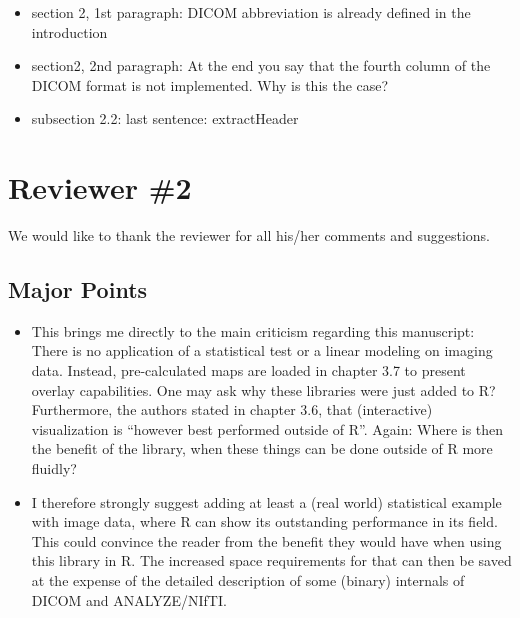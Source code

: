 \documentclass[11pt]{article}
\begin{document}
\begin{itemize} 

\item section 2, 1st paragraph: DICOM abbreviation is already defined
  in the introduction

\item section2, 2nd paragraph: At the end you say that the fourth
  column of the DICOM format is not implemented. Why is this the case?

\item subsection 2.2: last sentence: extractHeader

\end{itemize}

\section*{Reviewer \#2}

We would like to thank the reviewer for all his/her comments and
suggestions.

\subsection*{Major Points}

\begin{itemize}

\item This brings me directly to the main criticism regarding this
  manuscript: There is no application of a statistical test or a
  linear modeling on imaging data.  Instead, pre-calculated maps are
  loaded in chapter 3.7 to present overlay capabilities.  One may ask
  why these libraries were just added to R?  Furthermore, the authors
  stated in chapter 3.6, that (interactive) visualization is ``however
  best performed outside of R''.  Again: Where is then the benefit of
  the library, when these things can be done outside of R more
  fluidly?

\item I therefore strongly suggest adding at least a (real world)
  statistical example with image data, where R can show its
  outstanding performance in its field.  This could convince the
  reader from the benefit they would have when using this library in
  R.  The increased space requirements for that can then be saved at
  the expense of the detailed description of some (binary) internals
  of DICOM and ANALYZE/NIfTI.

\end{itemize}
\end{document}
